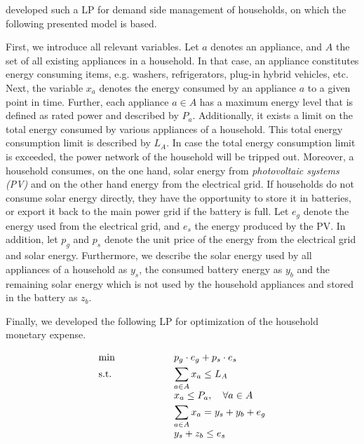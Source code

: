  developed such a LP for demand side management of households, on which the following
presented model is based. 

First, we introduce all relevant variables. Let $a$ denotes an appliance, and $A$ the set of all existing appliances in a household.
In that case, an appliance constitutes energy consuming items, e.g. washers, refrigerators, plug-in hybrid vehicles, etc.
Next, the variable $x_{a}$ denotes the energy consumed by an appliance $a$ to a given point in time. 
Further, each appliance $a \in A$ has a maximum energy level that is defined as rated power and described by $P_{a}$.
Additionally, it exists a limit on the total energy consumed by various appliances of a household. This total energy consumption limit is described by $L_{A}$. In case the total energy consumption limit is exceeded, the power network of the household will be tripped out.
Moreover, a household consumes, on the one hand, solar energy from
\textit{photovoltaic systems (PV)} and on the other hand energy from the electrical grid. 
If households do not consume solar energy directly, they have the opportunity to 
store it in batteries, or export it back to the main power grid if the battery is full.
Let $e_{g}$ denote the energy used from the electrical grid, and $e_{s}$ the energy produced by the PV.
In addition, let $p_{g}$ and $p_{s}$ denote the unit price of the energy from the electrical grid and solar energy.
Furthermore, we describe the solar energy used by all appliances of a household as $y_{s}$, the consumed battery energy 
as $y_{b}$ and the remaining solar energy which is not used by the household appliances and stored in the battery as $z_{b}$.

Finally, we developed the following LP for optimization of the household monetary expense.

\begin{equation}
 \begin{array}{ll@{}ll}
 \text{min} & \displaystyle p_{g} \cdot e_{g} + p_{s} \cdot e_{s} &\\
 \text{s.t.}& \displaystyle \sum\limits_{a \in A}^{} x_{a} \leq L_{A} \\
                    & \displaystyle x_{a} \leq P_{a}, \quad \forall a \in A \\
                    & \displaystyle \sum\limits_{a \in A}^{} x_{a} = y_{s} + y_{b} + e_{g} \\
                    & \displaystyle y_{s} + z_{b} \leq e_{s}
 \end{array}
\end{equation}

